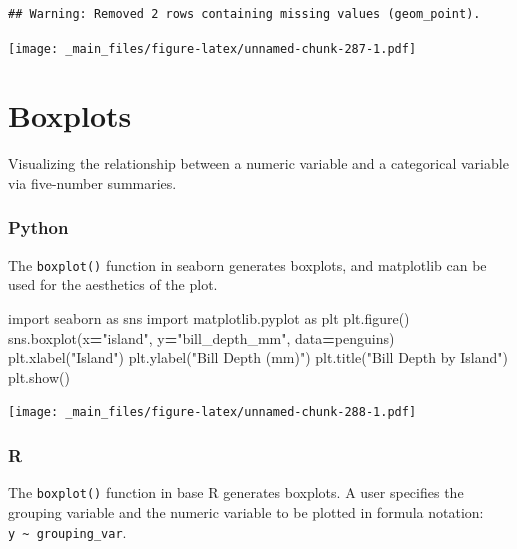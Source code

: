 \documentclass[
]{book}
\newenvironment{Shaded}{\begin{snugshade}}{\end{snugshade}}
\newcommand{\ImportTok}[1]{#1}
\newcommand{\NormalTok}[1]{#1}
\newcommand{\OperatorTok}[1]{\textcolor[rgb]{0.81,0.36,0.00}{\textbf{#1}}}
\newcommand{\StringTok}[1]{\textcolor[rgb]{0.31,0.60,0.02}{#1}}
\begin{document}
\begin{verbatim}
## Warning: Removed 2 rows containing missing values (geom_point).
\end{verbatim}

\texttt{[image: \_main\_files/figure-latex/unnamed-chunk-287-1.pdf]}

\hypertarget{boxplots}{%
\section{Boxplots}\label{boxplots}}

Visualizing the relationship between a numeric variable and a categorical variable via five-number summaries.

\hypertarget{python-45}{%
\subsubsection*{Python}\label{python-45}}

The \texttt{boxplot()} function in seaborn generates boxplots, and matplotlib can be used for the aesthetics of the plot.

\begin{Shaded}
\begin{Highlighting}[]
\ImportTok{import}\NormalTok{ seaborn }\ImportTok{as}\NormalTok{ sns}
\ImportTok{import}\NormalTok{ matplotlib.pyplot }\ImportTok{as}\NormalTok{ plt}
\NormalTok{plt.figure()}
\NormalTok{sns.boxplot(x}\OperatorTok{=}\StringTok{"island"}\NormalTok{, y}\OperatorTok{=}\StringTok{"bill\_depth\_mm"}\NormalTok{, data}\OperatorTok{=}\NormalTok{penguins)}
\NormalTok{plt.xlabel(}\StringTok{"Island"}\NormalTok{)}
\NormalTok{plt.ylabel(}\StringTok{"Bill Depth (mm)"}\NormalTok{)}
\NormalTok{plt.title(}\StringTok{"Bill Depth by Island"}\NormalTok{)}
\NormalTok{plt.show()}
\end{Highlighting}
\end{Shaded}

\texttt{[image: \_main\_files/figure-latex/unnamed-chunk-288-1.pdf]}

\hypertarget{r-45}{%
\subsubsection*{R}\label{r-45}}

The \texttt{boxplot()} function in base R generates boxplots. A user specifies the grouping variable and the numeric variable to be plotted in formula notation: \texttt{y\ \textasciitilde{}\ grouping\_var}.
\end{document}
